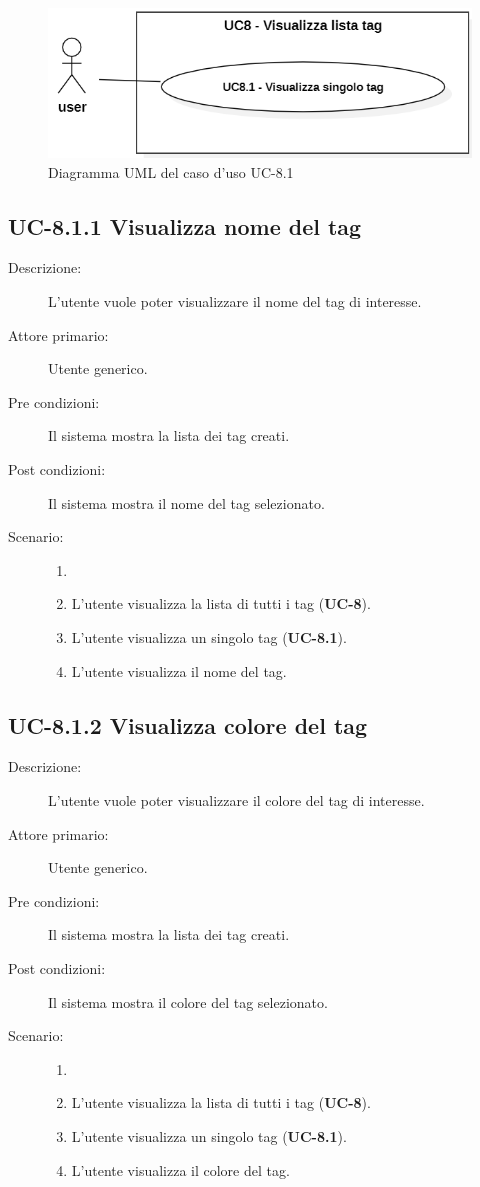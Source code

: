 \begin{figure}[H]
    \centering
    \includegraphics[width=0.8\linewidth]{UC8.1.PNG} %
    \caption{Diagramma UML del caso d'uso UC-8.1}
    \label{fig:UC8.10}
\end{figure}
\subsection{UC-8.1.1 Visualizza nome del tag}
\begin{description}
    \item[Descrizione:] L’utente vuole poter visualizzare il nome del tag di interesse.
    \item[Attore primario:] Utente generico.
    \item[Pre condizioni:] Il sistema mostra la lista dei tag creati.
    \item[Post condizioni:] Il sistema mostra il nome del tag selezionato.
    \item[Scenario:]
    \begin{enumerate}
        \item[]
        \item L’utente visualizza la lista di tutti i tag (\textbf{UC-8}).
        \item L'utente visualizza un singolo tag (\textbf{UC-8.1}).
        \item L'utente visualizza il nome del tag.
    \end{enumerate}
\end{description}

\subsection{UC-8.1.2 Visualizza colore del tag}
\begin{description}
    \item[Descrizione:] L’utente vuole poter visualizzare il colore del tag di interesse.
    \item[Attore primario:] Utente generico.
    \item[Pre condizioni:] Il sistema mostra la lista dei tag creati.
    \item[Post condizioni:] Il sistema mostra il colore del tag selezionato.
    \item[Scenario:] 
    \begin{enumerate}
        \item[]
        \item L’utente visualizza la lista di tutti i tag (\textbf{UC-8}).
        \item L'utente visualizza un singolo tag (\textbf{UC-8.1}).
        \item L'utente visualizza il colore del tag.
    \end{enumerate}
\end{description}

